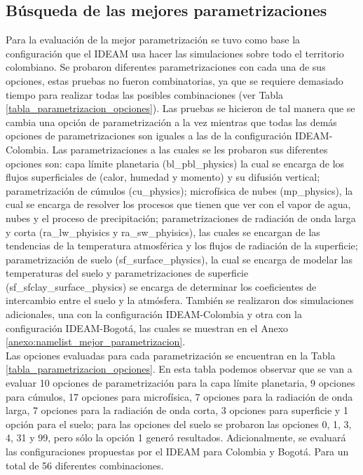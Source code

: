 \begin{itemize}
\section{Búsqueda de las mejores parametrizaciones}

Para la evaluación de la mejor parametrización se tuvo como base la configuración que el IDEAM usa hacer las simulaciones sobre todo el territorio colombiano. Se probaron diferentes parametrizaciones con cada una de sus opciones, estas pruebas no fueron combinatorias, ya que se requiere demasiado tiempo para realizar todas las posibles combinaciones (ver Tabla \ref{tabla_parametrizacion_opciones}). Las pruebas se hicieron de tal manera que se cambia una opción de parametrización a la vez mientras que todas las demás opciones de parametrizaciones son iguales a las de la configuración IDEAM-Colombia. Las parametrizaciones a las cuales se les probaron sus diferentes opciones son: capa límite planetaria (bl\_pbl\_physics) la cual se encarga de los flujos superficiales de (calor, humedad y momento) y su difusión vertical; parametrización de cúmulos (cu\_physics); microfísica de nubes (mp\_physics), la cual se encarga de resolver los procesos que tienen que ver con el vapor de agua, nubes y el proceso de precipitación; parametrizaciones de radiación de onda larga y corta (ra\_lw\_phyisics y ra\_sw\_phyisics), las cuales se encargan de las tendencias de la temperatura atmosférica y los flujos de radiación de la superficie; parametrización de suelo (sf\_surface\_physics), la cual se encarga de modelar las temperaturas del suelo y parametrizaciones de superficie (sf\_sfclay\_surface\_physics) se encarga de determinar los coeficientes de intercambio entre el suelo y la atmósfera. También se realizaron dos simulaciones adicionales, una con la configuración IDEAM-Colombia y otra con la configuración IDEAM-Bogotá, las cuales se muestran en el Anexo \ref{anexo:namelist_mejor_parametrizacion}.\\


Las opciones evaluadas para cada parametrización se encuentran en la Tabla \ref{tabla_parametrizacion_opciones}. En esta tabla podemos observar que se van a evaluar 10 opciones de parametrización para la capa límite planetaria, 9 opciones para cúmulos, 17 opciones para microfísica, 7 opciones para la radiación de onda larga, 7 opciones para la radiación de onda corta, 3 opciones para superficie y 1 opción para el suelo; para las opciones del suelo se probaron las opciones 0, 1, 3, 4, 31 y 99, pero sólo la opción 1 generó resultados. Adicionalmente, se evaluará las configuraciones propuestas por el IDEAM para Colombia y Bogotá. Para un total de 56 diferentes combinaciones.


\end{itemize}
